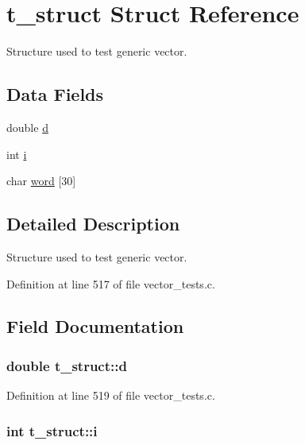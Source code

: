\hypertarget{structt__struct}{
\section{t\_\-struct Struct Reference}
\label{structt__struct}
}


Structure used to test generic vector.  


\subsection*{Data Fields}
\begin{DoxyCompactItemize}
\item 
double \hyperlink{structt__struct_a2029e2f2da88d23bcc9fa6ba45f51bf4}{d}
\item 
int \hyperlink{structt__struct_a488184c86cae0be164cfb634882b8f7a}{i}
\item 
char \hyperlink{structt__struct_ab5b290b572fc4036f1e5efc671098c7f}{word} \mbox{[}30\mbox{]}
\end{DoxyCompactItemize}


\subsection{Detailed Description}
Structure used to test generic vector. 

Definition at line 517 of file vector\_\-tests.c.



\subsection{Field Documentation}
\hypertarget{structt__struct_a2029e2f2da88d23bcc9fa6ba45f51bf4}{
\subsubsection[{d}]{\setlength{\rightskip}{0pt plus 5cm}double {\bf t\_\-struct::d}}}
\label{structt__struct_a2029e2f2da88d23bcc9fa6ba45f51bf4}


Definition at line 519 of file vector\_\-tests.c.

\hypertarget{structt__struct_a488184c86cae0be164cfb634882b8f7a}{
\subsubsection[{i}]{\setlength{\rightskip}{0pt plus 5cm}int {\bf t\_\-struct::i}}}
\label{structt__struct_a488184c86cae0be164cfb634882b8f7a}


